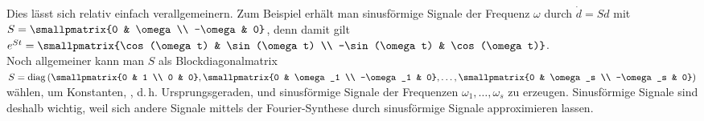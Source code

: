 Dies lässt sich relativ einfach verallgemeinern.
Zum Beispiel erhält man sinusförmige Signale der Frequenz $\omega$ durch
$\dot{d} = Sd$ mit
$S = \smallpmatrix{0 & \omega \\ -\omega & 0}$,
denn damit gilt $e^{St} =
\smallpmatrix{\cos(\omega t) & \sin(\omega t) \\ -\sin(\omega t) & \cos(\omega t)}$.\\
Noch allgemeiner kann man $S$ als Blockdiagonalmatrix
$S = \diag\left(\smallpmatrix{0 & 1 \\ 0 & 0}, \smallpmatrix{0 & \omega_1 \\ -\omega_1 & 0},
\dotsc, \smallpmatrix{0 & \omega_s \\ -\omega_s & 0}\right)$ wählen, um Konstanten,
, d.\,h. Ursprungsgeraden, und sinusförmige Signale der Frequenzen
$\omega_1, \dotsc, \omega_s$ zu erzeugen.
Sinusförmige Signale sind deshalb wichtig, weil sich andere Signale mittels der Fourier-Synthese
durch sinusförmige Signale approximieren lassen.

\linie

